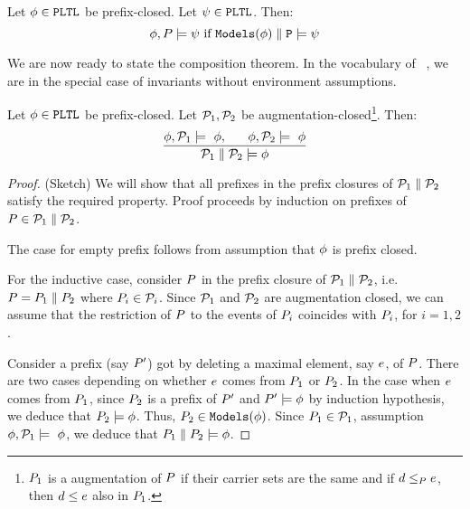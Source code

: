\begin{definition}
Let $\phi \in {\tt PLTL}$ be prefix-closed.  Let $ \psi \in {\tt PLTL}$.  Then:
\[ \phi, P \models \psi  \mbox{ if } \tt Models{(\phi)} \parallel P \models \psi \]
\end{definition}
We are now ready to state the composition theorem.    In the vocabulary of ~\citet{Abadi:1993:CS:151646.151649}, we are in the special case of invariants without environment assumptions.
\begin{lemma}[Composition]
Let $\phi \in {\tt PLTL}$ be prefix-closed.  Let $\mathcal{P}_1, \mathcal{P}_2$ be augmentation-closed\footnote{$P_1$ is a augmentation of $P$ if their carrier sets are the same and if  $ d \le_{P} e$, then $d \le e$ also in $P_1$.}.  Then:
\[
\frac{\afo, \aPSS_1 \models\ \afo, \ \ \ \ \ \afo, \aPSS_2 \models\ \afo}{\aPSS_1 \parallel \aPSS_2 \models \afo}
\]
\end{lemma}
\begin{proof}(Sketch)
We will show that all prefixes in the prefix closures of  $\mathcal{P}_1 \parallel \mathcal{P}_2$ satisfy the required property.   Proof proceeds by induction on prefixes of $P \in \mathcal{P}_1 \parallel \mathcal{P}_2$.    

The case for empty prefix  follows from assumption that  $\phi$ is prefix closed.  

For the inductive case, consider $P$ in the prefix closure of $\mathcal{P}_1 \parallel \mathcal{P}_2$, i.e. $P = P_1 \parallel P_2$ where $P_i \in \mathcal{P}_i$.   Since  $\mathcal{P}_1$ and $\mathcal{P}_2$ are augmentation closed, we can assume that the restriction of $P$ to the events of $P_i$ coincides with $P_i$, for $i=1,2$.  

Consider a prefix (say $P'$) got by deleting a maximal element, say $e$, of $P$.  There are two cases depending on whether $e$ comes from $P_1$ or $P_2$.  In the case when $e$ comes from $P_1$, since $P_2$ is a prefix of $P'$ and $P' \models \phi$ by induction hypothesis, we deduce that  $P_2 \models \phi$.     Thus, $P_2 \in \tt Models{(\phi)}$.  Since $P_1 \in \mathcal{P}_1$, assumption $\phi, \mathcal{P}_1 \models\ \phi$,  we deduce that $P_1 \parallel P_2 \models \phi$.   
\end{proof}

\endinput

